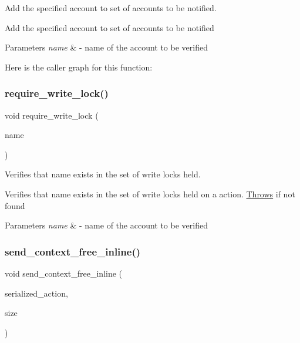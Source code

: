 Add the specified account to set of accounts to be notified. 

Add the specified account to set of accounts to be notified 
\begin{DoxyParams}{Parameters}
{\em name} & -\/ name of the account to be verified \\
\hline
\end{DoxyParams}
Here is the caller graph for this function\+:
\mbox{\label{group__actioncapi_ga9893f539cf6d56989eb6e0d4ce51a813}} 
\subsubsection{\texorpdfstring{require\+\_\+write\+\_\+lock()}{require\_write\_lock()}}
{\footnotesize\ttfamily void require\+\_\+write\+\_\+lock (\begin{DoxyParamCaption}\item[{account\+\_\+name}]{name }\end{DoxyParamCaption})}



Verifies that name exists in the set of write locks held. 

Verifies that name exists in the set of write locks held on a action. \mbox{\hyperlink{struct_throws}{Throws}} if not found 
\begin{DoxyParams}{Parameters}
{\em name} & -\/ name of the account to be verified \\
\hline
\end{DoxyParams}
\mbox{\label{group__actioncapi_ga30b1cab2d60f843eb2d496e754e41705}} 
\subsubsection{\texorpdfstring{send\+\_\+context\+\_\+free\+\_\+inline()}{send\_context\_free\_inline()}}
{\footnotesize\ttfamily void send\+\_\+context\+\_\+free\+\_\+inline (\begin{DoxyParamCaption}\item[{char $\ast$}]{serialized\+\_\+action,  }\item[{size\+\_\+t}]{size }\end{DoxyParamCaption})}

